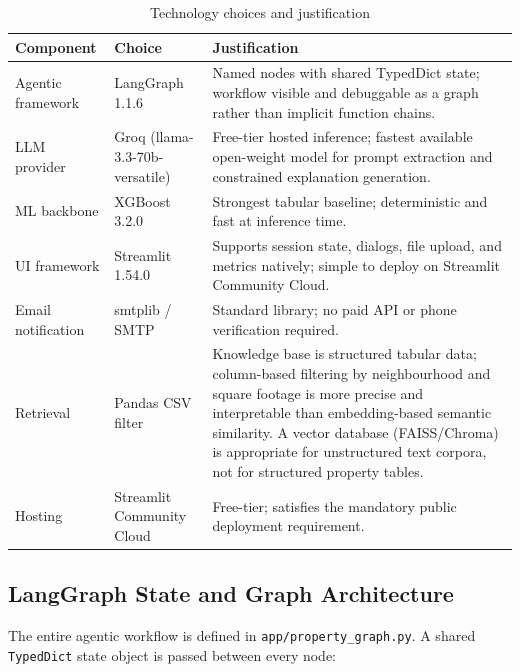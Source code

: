 \documentclass[12pt,a4paper]{article}
\begin{document}
\begin{table}[H]
\centering
\caption{Technology choices and justification}
\begin{tabularx}{\linewidth}{llX}
\toprule
\textbf{Component} & \textbf{Choice} & \textbf{Justification} \\
\midrule
Agentic framework   & LangGraph 1.1.6  & Named nodes with shared TypedDict state; workflow visible and debuggable as a graph rather than implicit function chains. \\
LLM provider        & Groq (llama-3.3-70b-versatile) & Free-tier hosted inference; fastest available open-weight model for prompt extraction and constrained explanation generation. \\
ML backbone         & XGBoost 3.2.0    & Strongest tabular baseline; deterministic and fast at inference time. \\
UI framework        & Streamlit 1.54.0 & Supports session state, dialogs, file upload, and metrics natively; simple to deploy on Streamlit Community Cloud. \\
Email notification  & smtplib / SMTP   & Standard library; no paid API or phone verification required. \\
Retrieval           & Pandas CSV filter & Knowledge base is structured tabular data; column-based filtering by neighbourhood and square footage is more precise and interpretable than embedding-based semantic similarity. A vector database (FAISS/Chroma) is appropriate for unstructured text corpora, not for structured property tables. \\
Hosting             & Streamlit Community Cloud & Free-tier; satisfies the mandatory public deployment requirement. \\
\bottomrule
\end{tabularx}
\end{table}

\subsection{LangGraph State and Graph Architecture}

The entire agentic workflow is defined in \texttt{app/property\_graph.py}. A shared \texttt{TypedDict} state object is passed between every node:
\end{document}
